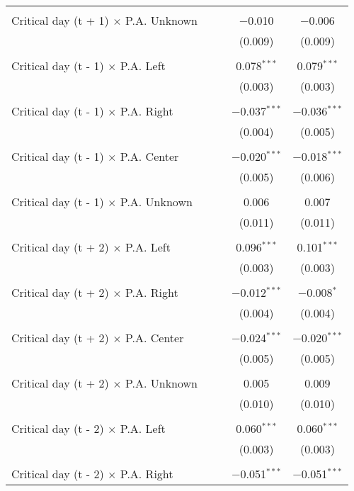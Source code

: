 \documentclass[
]{article}
\begin{document}
\begin{table}[!htbp]
{\begin{tabular}{@{\extracolsep{5pt}}lcccc}
  & & & & \\ 
 Critical day (t + 1) $\times$ P.A. Unknown &  &  & $-$0.010 & $-$0.006 \\ 
  &  &  & (0.009) & (0.009) \\ 
  & & & & \\ 
 Critical day (t - 1) $\times$ P.A. Left &  &  & 0.078$^{***}$ & 0.079$^{***}$ \\ 
  &  &  & (0.003) & (0.003) \\ 
  & & & & \\ 
 Critical day (t - 1) $\times$ P.A. Right &  &  & $-$0.037$^{***}$ & $-$0.036$^{***}$ \\ 
  &  &  & (0.004) & (0.005) \\ 
  & & & & \\ 
 Critical day (t - 1) $\times$ P.A. Center &  &  & $-$0.020$^{***}$ & $-$0.018$^{***}$ \\ 
  &  &  & (0.005) & (0.006) \\ 
  & & & & \\ 
 Critical day (t - 1) $\times$ P.A. Unknown &  &  & 0.006 & 0.007 \\ 
  &  &  & (0.011) & (0.011) \\ 
  & & & & \\ 
 Critical day (t + 2) $\times$ P.A. Left &  &  & 0.096$^{***}$ & 0.101$^{***}$ \\ 
  &  &  & (0.003) & (0.003) \\ 
  & & & & \\ 
 Critical day (t + 2) $\times$ P.A. Right &  &  & $-$0.012$^{***}$ & $-$0.008$^{*}$ \\ 
  &  &  & (0.004) & (0.004) \\ 
  & & & & \\ 
 Critical day (t + 2) $\times$ P.A. Center &  &  & $-$0.024$^{***}$ & $-$0.020$^{***}$ \\ 
  &  &  & (0.005) & (0.005) \\ 
  & & & & \\ 
 Critical day (t + 2) $\times$ P.A. Unknown &  &  & 0.005 & 0.009 \\ 
  &  &  & (0.010) & (0.010) \\ 
  & & & & \\ 
 Critical day (t - 2) $\times$ P.A. Left &  &  & 0.060$^{***}$ & 0.060$^{***}$ \\ 
  &  &  & (0.003) & (0.003) \\ 
  & & & & \\ 
 Critical day (t - 2) $\times$ P.A. Right &  &  & $-$0.051$^{***}$ & $-$0.051$^{***}$ \\ 

\end{tabular}}
\end{table}
\end{document}
